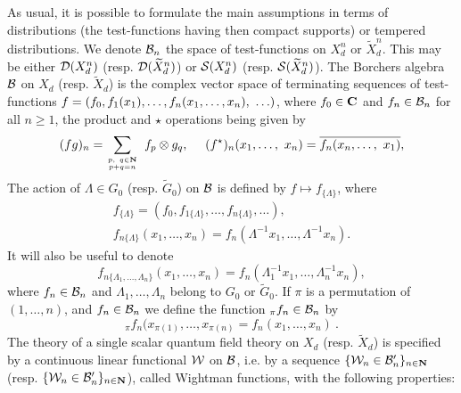 \documentclass[a4paper,a4paper]{article}
\def\bC{{\bf C}}
\def\bN{{\bf N}}
\def\BB{{\cal B}}
\def\DD{{\cal D}}
\def\SS{{\cal S}}
\def\WW{{\cal W}}
\def\wt{\widetilde}
\def\ovl{\overline}
\def\Xdn{X_d^n}
\def\wXdn{{\wt X_d^n}}
\begin{document}
\label{HYP}
As usual, it is possible to formulate the main assumptions in terms
of distributions (the test-functions having then compact supports)
or tempered distributions. We denote $\BB_n$ the space of test-functions on
$\Xdn$ or $\wXdn$. This may be either $\DD(\Xdn)$ (resp. $\DD(\wXdn)$)
or $\SS(\Xdn)$ (resp. $\SS(\wXdn)$).
The Borchers algebra $\BB$ on $X_d$ (resp. $\wt X_d$) is the
complex vector space of terminating sequences
of test-functions $f = (f_0, f_1(x_1),\ldots,
f_n(x_1,\ldots,x_n),\linebreak[0]\ \ldots)$, where $f_0 \in {\bC}$
and $f_n \in \BB_n$ for all $n \ge 1$,
the product and $\star$ operations being given by
\begin{equation}
(fg)_n =
\sum_{p,\ q \in \bN \atop p+q = n}\ f_p \otimes g_q,\ \ \ \
(f^\star)_n (x_1,\ldots,\ x_n) =
\ovl{f_n (x_n,\ldots,\ x_1)},
\label{4.1}\end{equation}
The action of $\Lambda \in G_0$ (resp. $\wt G_0$) on $\BB$ is defined by
$ f \mapsto f_{\{\Lambda\}}$, where
\begin{eqnarray}
f_{\{\Lambda\}} = (f_0, f_{1\{\Lambda\}},\ldots,f_{n\{\Lambda\}},\ldots),
\nonumber \\
f_{n\{\Lambda\}} ({x_{1}},\ldots,x_{n})
=f_{n} ({\Lambda}
^{-1}{x_{1}},\ldots,{\Lambda}^{-1}x_{n}).
\label{4.2}\end{eqnarray}
It will also be useful to denote
\begin{equation}
f_{n\{\Lambda_1,\ldots,\Lambda_n\}} (x_1,\ldots,x_n)
=f_{n} (\Lambda_1^{-1}x_1,\ldots,\Lambda_n^{-1}x_n),
\label{4.2.1}\end{equation}
where $f_n \in \BB_n$ and $\Lambda_1,\ldots,\Lambda_n$
belong to $G_0$ or $\wt G_0$.
If $\pi$ is a permutation of $(1,\ldots,n)$, and $f_n \in \BB_n$
we define the function $_\pi f_n \in \BB_n$ by
\begin{equation}
_\pi f_n(x_{\pi(1)},\ldots,x_{\pi(n)} =
f_n(x_1,\ldots,x_n)\ .
\label{4.2.2}\end{equation}
The theory of a single scalar quantum field theory on $X_d$
(resp. $\wt X_d$) is specified by a continuous linear functional
$\WW$ on $\BB$,
i.e. by a sequence $\{\WW_n \in \BB'_n\}_{n \in \bN}$
(resp. $\{\WW_n \in \BB'_n\}_{n \in \bN}$),
called Wightman functions, with the
following properties:
\end{document}
